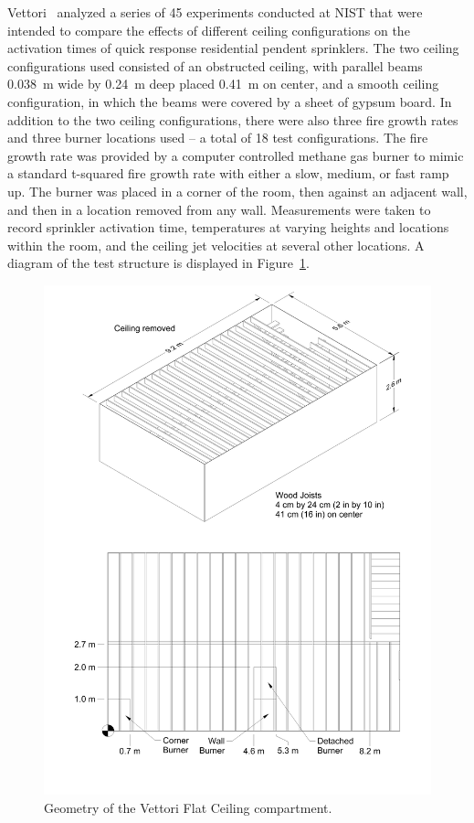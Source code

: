 Vettori~\cite{Vettori:1} analyzed a series of 45 experiments conducted at NIST that were intended to compare the effects of different ceiling configurations on the activation times of quick response residential pendent sprinklers. The two ceiling configurations used consisted of an obstructed ceiling, with parallel beams 0.038~m wide by 0.24~m deep placed 0.41~m on center, and a smooth ceiling configuration, in which the beams were covered by a sheet of gypsum board.  In addition to the two ceiling configurations, there were also three fire growth rates and three burner locations used -- a total of 18 test configurations. The fire growth rate was provided by a computer controlled methane gas burner to mimic a standard t-squared fire growth rate with either a slow, medium, or fast ramp up. The burner was placed in a corner of the room, then against an adjacent wall, and then in a location removed from any wall. Measurements were taken to record sprinkler activation time, temperatures at varying heights and locations within the room, and the ceiling jet velocities at several other locations.  A diagram of the test structure is displayed in Figure~\ref{Vettori_Drawing}.

\begin{figure}
\begin{center}
\includegraphics[height=6.in]{FIGURES/Vettori_Flat_Ceiling/Vettori_Flat_Ceiling}
\end{center}
\caption[Geometry of the Vettori Flat Ceiling compartment]{Geometry of the Vettori Flat Ceiling compartment.}
\label{Vettori_Drawing}
\end{figure}


